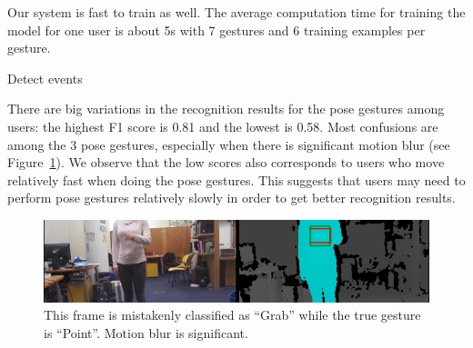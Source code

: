Our system is fast to train as well. The average computation time for training
the model for one user is about 5s with 7 gestures and 6 training examples per
gesture.

Detect events

There are big variations in the recognition results for the pose gestures among
users: the highest F1 score is 0.81 and the lowest is 0.58. Most confusions are among the 3 pose gestures, especially when there is
significant motion blur (see Figure~\ref{fig:point_grab}). We observe that
the low scores also corresponds to users who move relatively fast when doing the
pose gestures. This suggests that users may need to perform pose gestures
relatively slowly in order to get better recognition results. 

\begin{figure}[tbh]
\centering
\includegraphics[width=\linewidth]{figures/point_blur.png}
\caption{This frame is mistakenly classified as ``Grab'' while the true gesture
is ``Point''. Motion blur is significant.}
\label{fig:point_grab}
\end{figure}
